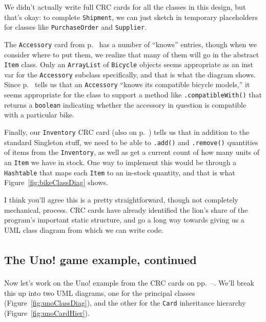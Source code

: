 We didn't actually write full CRC cards for all the classes in this design, but
that's okay: to complete \texttt{Shipment}, we can just sketch in temporary
placeholders for classes like \texttt{PurchaseOrder} and \texttt{Supplier}.


The \texttt{Accessory} card from p.~\pageref{bikeCRC2} has a number of
``knows'' entries, though when we consider where to put them, we realize that
many of them will go in the abstract \texttt{Item} class. Only an
\texttt{ArrayList} of \texttt{Bicycle} objects seems appropriate as an inst var
for the \texttt{Accessory} subclass specifically, and that is what the diagram
shows. Since p.~\pageref{bikeCRC2} tells us that an \texttt{Accessory} ``knows
its compatible bicycle models,'' it seems appropriate for the class to support
a method like \texttt{.compatibleWith()} that returns a \texttt{boolean}
indicating whether the accessory in question is compatible with a particular
bike.

Finally, our \texttt{Inventory} CRC card (also on p.~\pageref{bikeCRC2}) tells
us that in addition to the standard Singleton stuff, we need to be able to
\texttt{.add()} and \texttt{.remove()} quantities of items from the
\texttt{Inventory}, as well as get a current count of how many units of an
\texttt{Item} we have in stock. One way to implement this would be through a
\texttt{Hashtable} that maps each \texttt{Item} to an in-stock quantity, and
that is what Figure~\ref{fig:bikeClassDiag} shows.

I think you'll agree this is a pretty straightforward, though not completely
mechanical, process. CRC cards have already identified the lion's share of the
program's important static structure, and go a long way towards giving us a UML
class diagram from which we can write code.

\subsection{The Uno!\textsuperscript{\textregistered} game example, continued}

Now let's work on the Uno!\textsuperscript{\textregistered} example from the
CRC cards on pp.~\pageref{unoCRC1}--\pageref{unoCRC2}. We'll break this up into
two UML diagrams, one for the principal classes
(Figure~\ref{fig:unoClassDiag}), and the other for the \texttt{Card}
inheritance hierarchy (Figure~\ref{fig:unoCardHier}).

